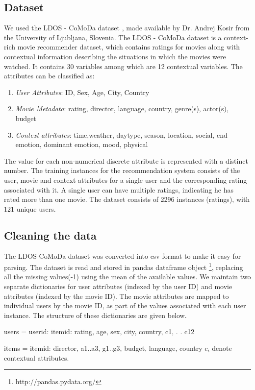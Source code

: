 \documentclass{article}
\begin{document}
\subsection{Dataset}
We used the LDOS - CoMoDa dataset \cite{kovsir2011database}, made available by Dr. Andrej Kosir from the University of Ljubljana, Slovenia. The LDOS - CoMoDa dataset is a context-rich movie recommender dataset, which contains ratings for movies along with contextual information describing the situations in which the movies were watched. 
It contains 30 variables among which are 12 contextual variables. The attributes can be classified as:
\begin{enumerate}
\item \emph{User Attributes}: ID, Sex, Age, City, Country
\item \emph{Movie Metadata}: rating, director, language, country, genre(s), actor(s), budget
\item \emph{Context attributes}: time,weather, daytype, season, location, social, end emotion, dominant emotion, mood, physical
\end{enumerate}
The value for each non-numerical discrete attribute is represented with a distinct number. The training instances for the recommendation system consists of the user, movie and context attributes for a single user and the corresponding rating associated with it. A single user can have multiple ratings, indicating he has rated more than one movie. The dataset consists of 2296 instances (ratings), with 121 unique users. 

\subsection{Cleaning the data}

The LDOS-CoMoDa dataset was converted into csv format to make it easy for parsing. The dataset is read and stored in pandas dataframe object \footnote{http://pandas.pydata.org/}, replacing all the missing values(-1) using the mean of the available values. We maintain two separate dictionaries for user attributes (indexed by the user ID) and movie attributes (indexed by the movie ID). The movie attributes are mapped to individual users by the movie ID, as part of the values associated with each user instance. The structure of these dictionaries are given below.

users = 
	{userid: 
		{itemid:  
			rating, 
			age,
			sex,
			city,
			country, 
			c1,
			.
			.
			c12}}

items = 
	{itemid: 
		{director, 
		a1..a3,
		g1..g3, 
		budget, 
		language, 
		country}}
$c_{i}$ denote contextual attributes.
\end{document}
